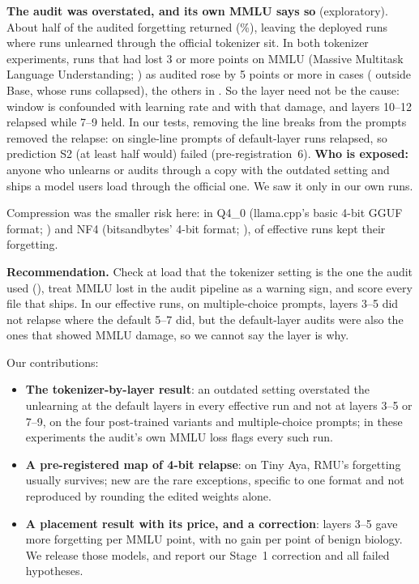 \documentclass[11pt]{article}
\newcommand{\fq}{\textsc{Q4\_0}}
\newcommand{\nf}{\textsc{NF4}}
\begin{document}
\textbf{The audit was overstated, and its own MMLU says so} (exploratory). About half of the audited forgetting returned (\stwoShareBack\%), leaving the deployed runs where runs unlearned through the official tokenizer sit. In both tokenizer experiments, runs that had lost 3 or more points on MMLU (Massive Multitask Language Understanding; \citealp{hendrycks2021mmlu}) as audited rose by 5 points or more in \dmgHurtRose{} cases (\dmgHurtRoseNoBase{} outside Base, whose runs collapsed), the others in \dmgFineRose. So the layer need not be the cause: window is confounded with learning rate and with that damage, and layers 10--12 relapsed while 7--9 held. In our tests, removing the line breaks from the prompts removed the relapse: on single-line prompts \slRelapses{} of \slEffective{} default-layer runs relapsed, so prediction S2 (at least half would) failed (pre-registration~6). \textbf{Who is exposed:} anyone who unlearns or audits through a copy with the outdated setting and ships a model users load through the official one. We saw it only in our own runs.

Compression was the smaller risk here: in \fq{} (llama.cpp's basic 4-bit GGUF format; \citealp{llamacpp,gguf}) and \nf{} (bitsandbytes' 4-bit format; \citealp{dettmers2023qlora,bitsandbytes}), \mapHeld{} of \mapEffective{} effective runs kept their forgetting.

\textbf{Recommendation.} Check at load that the tokenizer setting is the one the audit used (), treat MMLU lost in the audit pipeline as a warning sign, and score every file that ships. In our effective runs, on multiple-choice prompts, layers 3--5 did not relapse where the default 5--7 did, but the default-layer audits were also the ones that showed MMLU damage, so we cannot say the layer is why.

Our contributions:
\begin{itemize}
\item \textbf{The tokenizer-by-layer result}: an outdated setting overstated the unlearning at the default layers in every effective run and not at layers 3--5 or 7--9, on the four post-trained variants and multiple-choice prompts; in these experiments the audit's own MMLU loss flags every such run.
\item \textbf{A pre-registered map of 4-bit relapse}: on Tiny Aya, RMU's forgetting usually survives; new are the rare exceptions, specific to one format and not reproduced by rounding the edited weights alone.
\item \textbf{A placement result with its price, and a correction}: layers 3--5 gave more forgetting per MMLU point, with no gain per point of benign biology. We release those models, and report our Stage~1 correction and all \hypFailed{} failed hypotheses.
\end{itemize}
\end{document}
